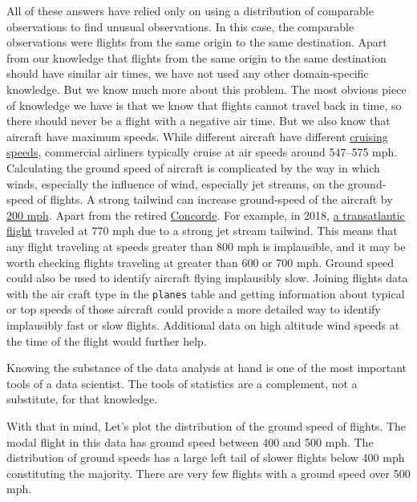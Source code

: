 \documentclass[]{book}
\theoremstyle{plain}
\theoremstyle{remark}
\begin{document}
All of these answers have relied only on using a distribution of comparable observations to find unusual observations.
In this case, the comparable observations were flights from the same origin to the same destination.
Apart from our knowledge that flights from the same origin to the same destination should have similar air times, we have not used any other domain-specific knowledge.
But we know much more about this problem.
The most obvious piece of knowledge we have is that we know that flights cannot travel back in time, so there should never be a flight with a negative air time.
But we also know that aircraft have maximum speeds.
While different aircraft have different \href{https://en.wikipedia.org/wiki/Cruise_(aeronautics)}{cruising speeds}, commercial airliners
typically cruise at air speeds around 547--575 mph.
Calculating the ground speed of aircraft is complicated by the way in which winds, especially the influence of wind, especially jet streams, on the ground-speed of flights.
A strong tailwind can increase ground-speed of the aircraft by \href{https://www.wired.com/story/norwegian-air-transatlantic-speed-record/}{200 mph}.
Apart from the retired \href{https://en.wikipedia.org/wiki/Concorde}{Concorde}.
For example, in 2018, \href{https://www.wired.com/story/norwegian-air-transatlantic-speed-record/}{a transatlantic flight}
traveled at 770 mph due to a strong jet stream tailwind.
This means that any flight traveling at speeds greater than 800 mph is implausible,
and it may be worth checking flights traveling at greater than 600 or 700 mph.
Ground speed could also be used to identify aircraft flying implausibly slow.
Joining flights data with the air craft type in the \texttt{planes} table and getting
information about typical or top speeds of those aircraft could provide a more
detailed way to identify implausibly fast or slow flights.
Additional data on high altitude wind speeds at the time of the flight would further help.

Knowing the substance of the data analysis at hand is one of the most important
tools of a data scientist. The tools of statistics are a complement, not a
substitute, for that knowledge.

With that in mind, Let's plot the distribution of the ground speed of flights.
The modal flight in this data has ground speed between 400 and 500 mph.
The distribution of ground speeds has a large left tail of slower flights below
400 mph constituting the majority.
There are very few flights with a ground speed over 500 mph.
\end{document}
